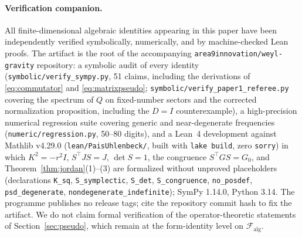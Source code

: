 \documentclass[11pt]{article}
\theoremstyle{definition}
\theoremstyle{remark}
\begin{document}
\paragraph{Verification companion.}
All finite-dimensional algebraic identities appearing in this paper have been
independently verified symbolically, numerically, and by machine-checked
Lean proofs.  The artifact is the root of the accompanying
\texttt{area9innovation/weyl-gravity} repository:
a symbolic audit of every identity
(\texttt{symbolic/verify\_sympy.py}, 51 claims, including the derivations
of \eqref{eq:commutator} and \eqref{eq:matrixpseudo};
\texttt{symbolic/verify\_paper1\_referee.py} covering the spectrum of $Q$
on fixed-number sectors and the corrected normalization proposition,
including the $D=I$ counterexample), a high-precision
numerical regression suite covering generic and near-degenerate
frequencies (\texttt{numeric/regression.py}, 50--80 digits),
and a Lean~4 development against Mathlib v4.29.0
(\texttt{lean/PaisUhlenbeck/}, built with \texttt{lake build}, zero
\texttt{sorry}) in which $K^2=-r^2I$, $S^{\top}JS=J$,
$\det S=1$, the congruence $S^{\top}GS=G_0$, and
Theorem~\ref{thm:jordan}(1)--(3) are formalized without unproved
placeholders (declarations \texttt{K\_sq}, \texttt{S\_symplectic},
\texttt{S\_det}, \texttt{S\_congruence}, \texttt{no\_posdef},
\texttt{psd\_degenerate}, \texttt{nondegenerate\_indefinite}); SymPy
1.14.0, Python 3.14.  The programme publishes no release tags; cite the
repository commit hash to fix the artifact.
We do not claim formal verification of the operator-theoretic
statements of Section~\ref{sec:pseudo}, which remain at the
form-identity level on $\mathcal F_{\mathrm{alg}}$.
\end{document}
